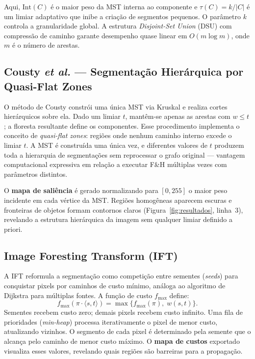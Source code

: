 \documentclass{sbc2023}
\begin{document}
Aqui, $\mathrm{Int}(C)$ é o maior peso da MST interna ao componente e $\tau(C)=k/|C| $ é um limiar adaptativo que inibe a criação de segmentos pequenos. O parâmetro $k$ controla a granularidade global. A estrutura \emph{Disjoint-Set Union} (DSU) com compressão de caminho garante desempenho quase linear em $O(m \log m)$, onde $m$ é o número de arestas.

\subsection{Cousty \emph{et al.} — Segmentação Hierárquica por Quasi-Flat Zones}

O método de Cousty \citep{cousty2018} constrói uma única MST via Kruskal e
realiza cortes hierárquicos sobre ela. Dado um limiar $t$, mantêm-se apenas as
arestas com $w \leq t$; a floresta resultante define os componentes. Esse
procedimento implementa o conceito de \emph{quasi-flat zones}: regiões onde
nenhum caminho interno excede o limiar $t$. A MST é construída uma única vez,
e diferentes valores de $t$ produzem toda a hierarquia de segmentações sem
reprocessar o grafo original — vantagem computacional expressiva em relação a
executar F\&H múltiplas vezes com parâmetros distintos.

O \textbf{mapa de saliência} é gerado normalizando para $[0,255]$ o maior peso
incidente em cada vértice da MST. Regiões homogêneas aparecem escuras e
fronteiras de objetos formam contornos claros (Figura~\ref{fig:resultados},
linha~3), revelando a estrutura hierárquica da imagem sem qualquer limiar
definido a priori.

\subsection{Image Foresting Transform (IFT)}

A IFT \citep{falcao2004} reformula a segmentação como competição entre sementes
(\emph{seeds}) para conquistar pixels por caminhos de custo mínimo, análoga ao
algoritmo de Dijkstra para múltiplas fontes. A função de custo $f_{\max}$ define:
\[
  f_{\max}(\pi \cdot \langle s,t \rangle) = \max\{f_{\max}(\pi),\; w(s,t)\}.
\]
Sementes recebem custo zero; demais pixels recebem custo infinito. Uma fila de
prioridades (\emph{min-heap}) processa iterativamente o pixel de menor custo,
atualizando vizinhos. O segmento de cada pixel é determinado pela semente que o
alcança pelo caminho de menor custo máximo. O \textbf{mapa de custos} exportado
visualiza esses valores, revelando quais regiões são barreiras para a propagação.
\end{document}
